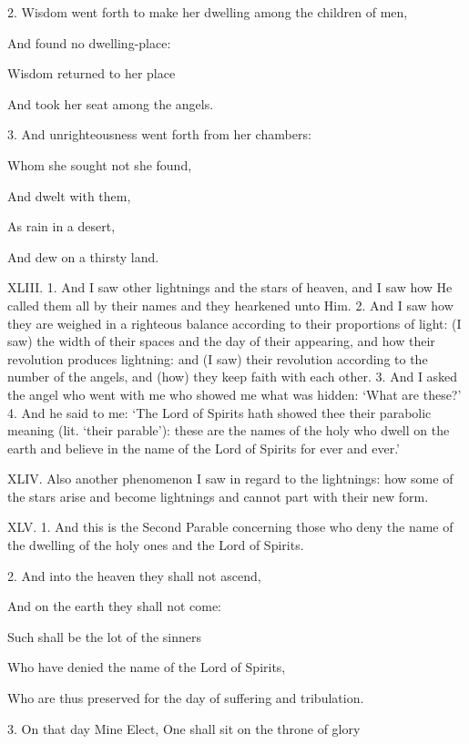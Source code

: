 2. Wisdom went forth to make her dwelling among the children of men,

And found no dwelling-place:

Wisdom returned to her place

And took her seat among the angels.

3. And unrighteousness went forth from her chambers:

Whom she sought not she found,

And dwelt with them,

As rain in a desert,

And dew on a thirsty land.


XLIII. 1. And I saw other lightnings and the
stars of heaven, and I saw how He called them all
by their names and they hearkened unto Him.
2. And I saw how they are weighed in a righteous
balance according to their proportions of light: (I
saw) the width of their spaces and the day of their
appearing, and how their revolution produces lightning:
and (I saw) their revolution according to the
number of the angels, and (how) they keep faith with
each other. 3. And I asked the angel who went
with me who showed me what was hidden: ‘What
are these?’ 4. And he said to me: ‘The Lord of
Spirits hath showed thee their parabolic meaning
(lit. ‘their parable’): these are the names of the
holy who dwell on the earth and believe in the name
of the Lord of Spirits for ever and ever.’

XLIV. Also another phenomenon I saw in regard
to the lightnings: how some of the stars arise and
become lightnings and cannot part with their new
form.



XLV. 1. And this is the Second Parable concerning
those who deny the name of the dwelling of
the holy ones and the Lord of Spirits.

2. And into the heaven they shall not ascend,

And on the earth they shall not come:

Such shall be the lot of the sinners

Who have denied the name of the Lord of Spirits,

Who are thus preserved for the day of suffering and tribulation.

3. On that day Mine Elect, One shall sit on the throne of glory

